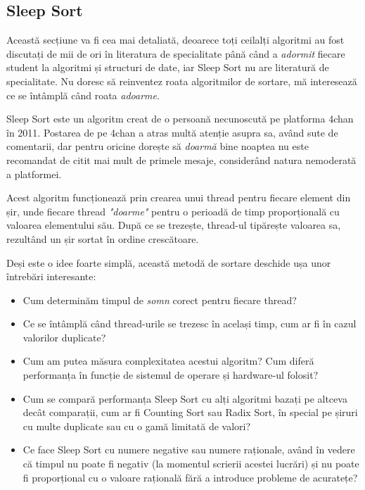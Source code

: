 \documentclass[9pt,a4paper,twocolumn,twoside]{rho-class/rho}
\begin{document}
\subsection{Sleep Sort}

Această secțiune va fi cea mai detaliată, deoarece toți ceilalți 
algoritmi au fost discutați de mii de ori în literatura de 
specialitate până când a \textit{adormit} fiecare student la algoritmi și structuri de date, iar Sleep Sort nu are literatură de specialitate.
Nu doresc să reinventez roata algoritmilor de sortare, 
mă interesează ce se întâmplă când roata \textit{adoarme}.


\par Sleep Sort este un algoritm creat de o persoană necunoscută pe platforma 4chan 
\cite{princeton_sleepsort}\cite{henney2023sleepsort}\cite{4chan2011sleepsort}
\cite{geeksforgeeks_sleepsort}\cite{opengenus_sleepsort}\cite{devto_sleepsort}
în 2011. Postarea \cite{4chan2011sleepsort} de pe 4chan a atras multă atenție asupra sa, având sute de comentarii,
dar pentru oricine dorește să \textit{doarmă} bine noaptea nu este recomandat de citit mai mult de primele mesaje,
considerând natura nemoderată a platformei.

\par Acest algoritm funcționează prin crearea unui thread \cite{cppreference_thread} pentru fiecare element din șir, 
unde fiecare thread \textit{"doarme"} \cite{cppreference_sleep} pentru o perioadă de timp proporțională cu valoarea elementului său. 
După ce se trezește, thread-ul tipărește valoarea sa, rezultând un șir sortat în ordine crescătoare.

\par Deși este o idee foarte simplă, această metodă de sortare deschide ușa unor întrebări interesante:
\begin{itemize}
    \item Cum determinăm timpul de \textit{somn} corect pentru fiecare thread? 
    \item Ce se întâmplă când thread-urile se trezesc în același timp, cum ar fi în cazul valorilor duplicate?
    \item Cum am putea măsura complexitatea acestui algoritm? Cum diferă performanța în funcție de sistemul de operare și hardware-ul folosit?
    \item Cum se compară performanța Sleep Sort cu alți algoritmi bazați pe altceva decât comparații, cum ar fi Counting Sort sau Radix Sort, în special pe șiruri cu multe duplicate sau cu o gamă limitată de valori?
    \item Ce face Sleep Sort cu numere negative sau numere raționale, având în vedere că timpul nu poate fi negativ (la momentul scrierii acestei lucrări) și nu poate fi proporțional cu o valoare rațională fără a introduce probleme de acuratețe?
\end{itemize}
\end{document}
